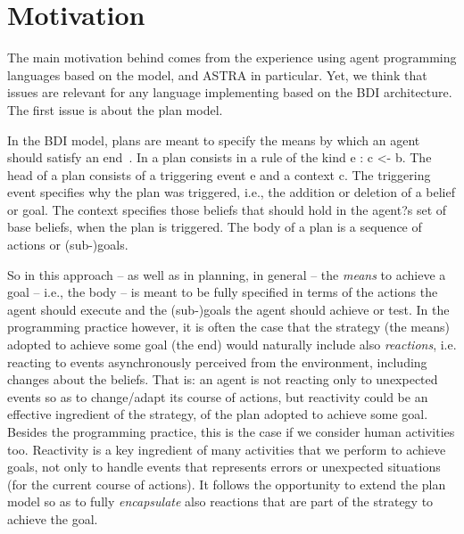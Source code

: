 \section{Motivation}
\label{sec:motivation}

The main motivation behind {\aser} comes from the experience using agent programming languages  based on the {\asl} model, {\jason} and ASTRA in particular.
%
Yet, we think that issues are relevant for any language implementing based on the BDI architecture.
%
The first issue is about the plan model.

%
In the BDI model, plans are meant to specify the means by which an agent should satisfy an end~\cite{Rao96}.  
%
In {\asl} a plan consists in a rule of the kind \textsf{e : c <- b}.
%
The head of a plan consists of a triggering event \textsf{e} and a context \textsf{c}.
%
The triggering event specifies why the plan was triggered, i.e., the addition or deletion of a belief or goal. 
%
The context specifies those beliefs that should hold in the agent?s set of base beliefs, when the plan is triggered. 
%
The body of a plan is a sequence of actions or (sub-)goals.
%

%
%
So in this approach -- as well as in planning, in general -- the \emph{means} to achieve a goal -- i.e., the body -- is meant to be fully specified in terms of the actions the agent should execute and the (sub-)goals the agent should achieve or test.
%
In the programming practice however, it is often the case that the strategy (the means) adopted to achieve some goal (the end) would naturally include also \emph{reactions}, i.e.  reacting to events  asynchronously perceived from the environment, including changes about the beliefs.
% 
That is: an agent is not reacting only to unexpected events so as to change/adapt its course of actions, but reactivity could be an effective ingredient of the strategy, of the plan adopted to achieve some goal.
%
Besides the programming practice, this is the case if we consider human activities too. Reactivity is a key ingredient of many activities that we perform to achieve goals, not only to handle events that represents errors or unexpected situations (for the current course of actions).
%
It follows the opportunity to extend the plan model so as to fully \emph{encapsulate} also reactions that are part of the strategy to achieve the goal.


